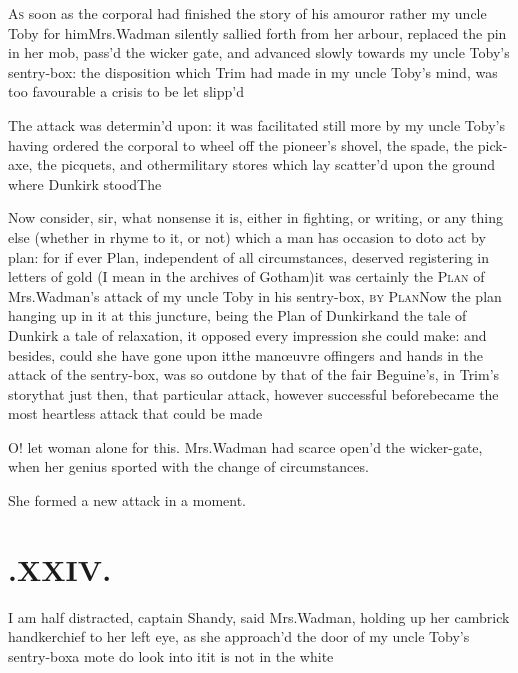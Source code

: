 \documentclass{article}
\begin{document}
\lettrine{A}{s} soon as the corporal had finished\break
the story of his amour\tsh or rather my uncle Toby for
him\tsk Mrs.\break Wadman silently sallied forth from her
arbour, replaced the pin in her mob, pass’d the wicker gate,
and advanced slowly towards my uncle Toby’s
sentry-box: the disposition which Trim had made in my uncle
Toby’s mind, was too favourable a crisis to be let
slipp’d\tsh

\tsh The attack was determin’d upon: it was facilitated still more by my uncle
Toby’s having ordered the corporal to wheel off the pioneer’s shovel, the spade, the
pick-axe, the picquets, and other\pb military stores which lay scatter’d upon the
ground where Dunkirk stood\tsk The 

Now consider, sir, what nonsense it is, either in fighting, or
writing, or any thing else (whether in rhyme to it, or not) which a
man has occasion to do\tsk\break to act by plan: for if ever Plan,
independent of all circumstances, deserved registering in letters
of gold (I mean in the archives of Gotham)\tsk it was
certainly the \textsc{Plan} of Mrs.\@ Wadman’s
attack of my uncle Toby in his sentry-box, \textsc{by}
\textsc{Plan}\tsh Now the plan hanging up in it at
this juncture, being the Plan of Dunkirk\tsk and the tale
of Dunkirk a tale of relaxation, it opposed every impression
she could make: and besides, could she have gone upon it\tsk the
manœuvre of\pb fingers and hands in the attack of the
sentry-box, was so outdone by that of the fair Beguine’s, in Trim’s
story\tsk that just then, that particular attack, however
successful before\tsk became the most heartless attack that could
be made\tsh

O! let woman alone for this. Mrs.\@ Wadman had scarce
open’d the wicker-gate, when her genius sported with the
change of circumstances.

\tsh She formed a new attack in a moment.

\newpage
\section{.\enspace XXIV.}

\quad\tsh I am half distracted, captain Shandy, said
Mrs.\@ Wadman, holding up her cambrick handkerchief to her
left eye, as she approach’d the door of my uncle
Toby’s sentry-box\tsh a mote \tsh\break
{}
do look into it\tsk it is not in the white\tsk 
\end{document}
